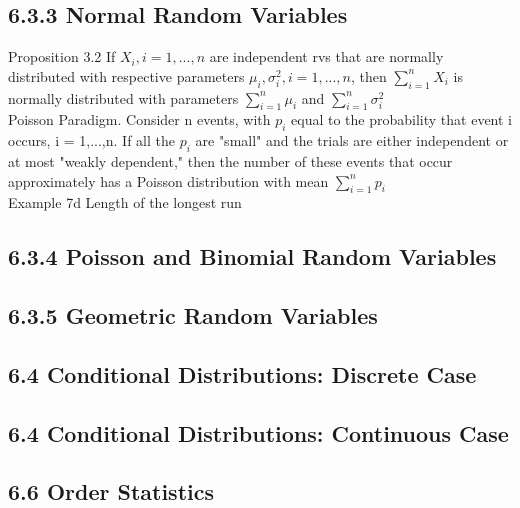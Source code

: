 \documentclass{article}
\begin{document}
\subsection*{6.3.3 Normal Random Variables}
Proposition 3.2 If $X_i, i = 1, ..., n$ are independent rvs that are normally distributed with respective parameters $\mu_i, \sigma_i^2, i = 1, ..., n$, then $\sum_{i=1}^n X_i$ is normally distributed with parameters $\sum_{i=1}^n \mu_i$ and $\sum_{i=1}^n \sigma_i^2$
\\
Poisson Paradigm. Consider n events, with $p_i$ equal to the probability that event i occurs, i = 1,...,n. If all the $p_i$ are "small" and the trials are either independent or at most "weakly dependent," then the number of these events that occur approximately has a Poisson distribution with mean $\sum_{i=1}^n p_i$\\
Example 7d Length of the longest run \\

\subsection*{6.3.4 Poisson and Binomial Random Variables}


\subsection*{6.3.5 Geometric Random Variables}

\subsection*{6.4 Conditional Distributions: Discrete Case}

\subsection*{6.4 Conditional Distributions: Continuous Case}

\subsection*{6.6 Order Statistics} 
\end{document}
